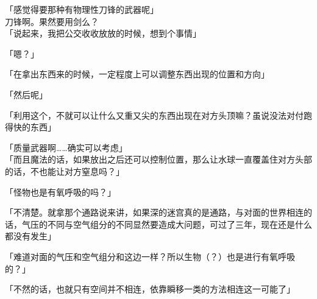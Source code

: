 「感觉得要那种有物理性刀锋的武器呢」\\

刀锋啊。果然要用剑么？\\

「说起来，我把公交收收放放的时候，想到个事情」

「嗯？」

「在拿出东西来的时候，一定程度上可以调整东西出现的位置和方向」

「然后呢」

「利用这个，不就可以让什么又重又尖的东西出现在对方头顶嘛？虽说没法对付跑得快的东西」

「质量武器啊……确实可以考虑」\\

「而且魔法的话，如果放出之后还可以控制位置，那么让水球一直覆盖住对方头部的话，不也能让对方窒息吗？」

「怪物也是有氧呼吸的吗？」

「不清楚。就拿那个通路说来讲，如果深的迷宫真的是通路，与对面的世界相连的话，气压的不同与空气组分的不同显然要造成大问题，可过了三年，现在还是什么都没有发生」

「难道对面的气压和空气组分和这边一样？所以生物（？）也是进行有氧呼吸的？」

「不然的话，也就只有空间并不相连，依靠瞬移一类的方法相连这一可能了」\\

